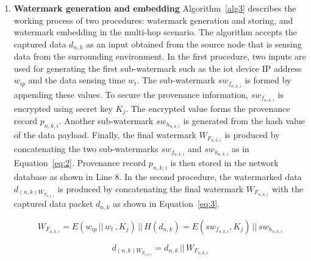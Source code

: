 \documentclass{llncs}
\begin{document}
\begin{enumerate}
\setlength{\itemsep}{10pt}

    \item \textbf{Watermark generation and embedding} Algorithm~\ref{alg3} describes the working process of two procedures: watermark generation and storing, and watermark embedding in the multi-hop scenario. The algorithm accepts the captured data $d_{n,k}$ as an input obtained from the source node that is sensing data from the surrounding environment. In the first procedure, two inputs are used for generating the first sub-watermark such as the \gls*{iot} device IP address $w_{ip}$ and the data sensing time $w_{t}$. The sub-watermark $sw_{f_{n,k,i}} $ is formed by appending these values. To secure the provenance information, $sw_{f_{n,k,i}}$ is encrypted using secret key $K_j$. The encrypted value forms the provenance record $p_{n,k,i}$. Another sub-watermark $sw_{h_{n,k,i}}$ is generated from the hash value of the data payload. Finally, the final watermark $W_{F_{n,k,i}}$ is produced by concatenating the two sub-watermarks $sw_{f_{n,k,i}}$ and $sw_{h_{n,k,i}}$ as in Equation~\eqref{eq:2}. Provenance record $p_{n,k,i}$ is then stored in the network database as shown in Line 8. In the second procedure, the watermarked data $d_{(n,k)W_{F_{n,k,i}}}$ is produced by concatenating the final watermark $W_{F_{n,k,i}}$ with the captured data packet $d_{n,k}$ as shown in Equation~\eqref{eq:3}.
    
    \begin{equation} \label{eq:2}
    W_{F_{n,k,i}} = E(w_{ip} \, || \, w_{t} \,,K_j) \, || \, H(d_{n,k})
    = E(sw_{f_{n,k,i}},K_j) \, || \, sw_{h_{n,k,i}}
    \end{equation}
    
    \begin{equation} \label{eq:3}
    d_{(n,k)W_{F_{n,k,i}}} = d_{n,k} \, || \, W_{F_{n,k,i}}
    \end{equation}
    


\end{enumerate}
\end{document}
